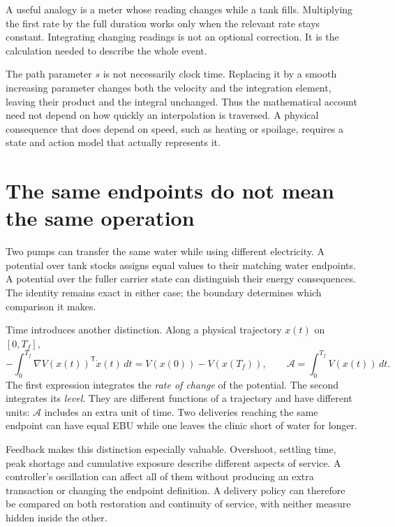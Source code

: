 A useful analogy is a meter whose reading changes while a tank fills. Multiplying the first rate by the full duration works only when the relevant rate stays constant. Integrating changing readings is not an optional correction. It is the calculation needed to describe the whole event.

The path parameter $s$ is not necessarily clock time. Replacing it by a smooth increasing parameter changes both the velocity and the integration element, leaving their product and the integral unchanged. Thus the mathematical account need not depend on how quickly an interpolation is traversed. A physical consequence that does depend on speed, such as heating or spoilage, requires a state and action model that actually represents it.

\section{The same endpoints do not mean the same operation}
Two pumps can transfer the same water while using different electricity. A potential over tank stocks assigns equal values to their matching water endpoints. A potential over the fuller carrier state can distinguish their energy consequences. The identity remains exact in either case; the boundary determines which comparison it makes.

Time introduces another distinction. Along a physical trajectory $x(t)$ on $[0,T_f]$,
\begin{equation}\label{eq:path-versus-exposure}
 -\int_0^{T_f}\nabla V(x(t))^{\mathsf T}\dot x(t)\,dt
 =V(x(0))-V(x(T_f)),\qquad
 \mathcal A=\int_0^{T_f}V(x(t))\,dt.
\end{equation}
The first expression integrates the \emph{rate of change} of the potential. The second integrates its \emph{level}. They are different functions of a trajectory and have different units: $\mathcal A$ includes an extra unit of time. Two deliveries reaching the same endpoint can have equal EBU while one leaves the clinic short of water for longer.

Feedback makes this distinction especially valuable. Overshoot, settling time, peak shortage and cumulative exposure describe different aspects of service. A controller's oscillation can affect all of them without producing an extra transaction or changing the endpoint definition. A delivery policy can therefore be compared on both restoration and continuity of service, with neither measure hidden inside the other.

